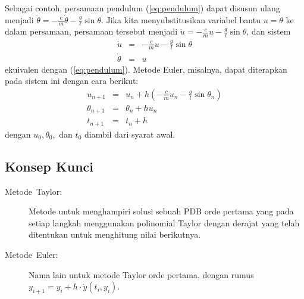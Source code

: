 Sebagai contoh, persamaan pendulum (\ref{eq:pendulum}) dapat disusun
ulang menjadi $\ddot{\theta}=-\frac{c}{m}\dot{\theta}-\frac{g}{\ell}\sin\theta$.
Jika kita menyubstitusikan variabel bantu $u=\dot{\theta}$ ke dalam
persamaan, persamaan tersebut menjadi $\dot{u}=-\frac{c}{m}u-\frac{g}{\ell}\sin\theta$,
dan sistem 
\begin{eqnarray*}
\dot{u} & = & -\frac{c}{m}u-\frac{g}{l}\sin\theta\\
\dot{\theta} & = & u
\end{eqnarray*}
ekuivalen dengan (\ref{eq:pendulum}). Metode Euler, misalnya, dapat
diterapkan pada sistem ini dengan cara berikut:
\begin{eqnarray*}
u_{n+1} & = & u_{n}+h\left(-\frac{c}{m}u_{n}-\frac{g}{l}\sin\theta_{n}\right)\\
\theta_{n+1} & = & \theta_{n}+hu_{n}\\
t_{n+1} & = & t_{n}+h
\end{eqnarray*}
dengan $u_{0},\theta_{0},$ dan $t_{0}$ diambil dari syarat awal.

\subsection{Konsep Kunci}
\begin{description}
\item [{Metode\ Taylor:}] Metode untuk menghampiri
solusi sebuah PDB orde pertama yang pada setiap langkah menggunakan
polinomial Taylor dengan derajat yang telah ditentukan untuk menghitung
nilai berikutnya.
\item [{Metode\ Euler:}] Nama lain untuk metode Taylor
orde pertama, dengan rumus $y_{i+1}=y_{i}+h\cdot\dot{y}(t_{i},y_{i})$.
\end{description}
\noindent\startexercises 

